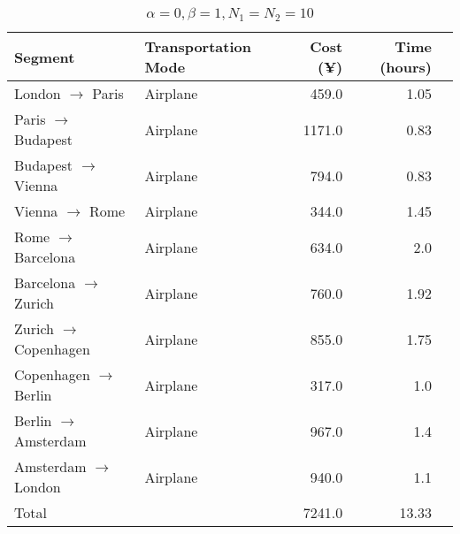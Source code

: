 \documentclass{article} %
\begin{document}
\begin{table}[!ht]
  \centering
  \begin{tabular}{llrrr}
    \toprule
    Segment                          & Transportation Mode & Cost (¥) & Time (hours) \\
    \midrule
    London $\rightarrow$  Paris      & Airplane            & 459.0    & 1.05         \\
    Paris $\rightarrow$  Budapest    & Airplane            & 1171.0   & 0.83         \\
    Budapest $\rightarrow$  Vienna   & Airplane            & 794.0    & 0.83         \\
    Vienna $\rightarrow$  Rome       & Airplane            & 344.0    & 1.45         \\
    Rome $\rightarrow$  Barcelona    & Airplane            & 634.0    & 2.0          \\
    Barcelona $\rightarrow$  Zurich  & Airplane            & 760.0    & 1.92         \\
    Zurich $\rightarrow$  Copenhagen & Airplane            & 855.0    & 1.75         \\
    Copenhagen $\rightarrow$  Berlin & Airplane            & 317.0    & 1.0          \\
    Berlin $\rightarrow$  Amsterdam  & Airplane            & 967.0    & 1.4          \\
    Amsterdam $\rightarrow$  London  & Airplane            & 940.0    & 1.1          \\
    \midrule
    Total                            &                     & 7241.0   & 13.33        \\
    \bottomrule
  \end{tabular}
  \caption{$\alpha=0, \beta=1, N_1=N_2=10$}%
  \label{tab:alpha0beta1}
\end{table}
\end{document}
